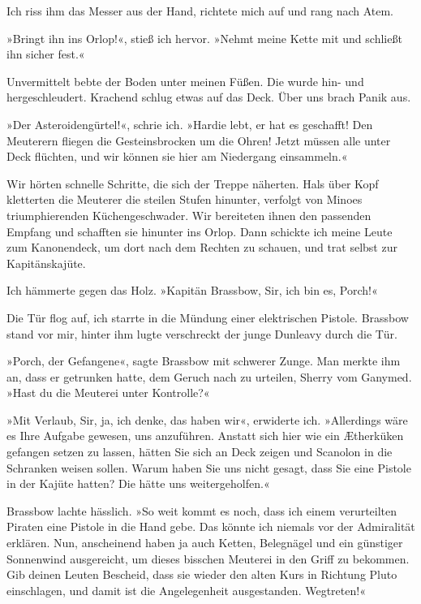 Ich riss ihm das Messer aus der Hand, richtete mich auf und rang
nach Atem.

»Bringt ihn ins Orlop!«, stieß ich hervor. »Nehmt meine Kette mit
und schließt ihn sicher fest.«

Unvermittelt bebte der Boden unter meinen Füßen. Die
 wurde hin- und hergeschleudert. Krachend schlug
etwas auf das Deck. Über uns brach Panik aus.

»Der Asteroidengürtel!«, schrie ich. »Hardie lebt, er hat es
geschafft! Den Meuterern fliegen die Gesteinsbrocken um die Ohren!
Jetzt müssen alle unter Deck flüchten, und wir können sie hier am
Niedergang einsammeln.«

Wir hörten schnelle Schritte, die sich der Treppe näherten. Hals
über Kopf kletterten die Meuterer die steilen Stufen hinunter,
verfolgt von Minoes triumphierenden Küchengeschwader. Wir
bereiteten ihnen den passenden Empfang und schafften sie hinunter
ins Orlop. Dann schickte ich meine Leute zum Kanonendeck, um dort
nach dem Rechten zu schauen, und trat selbst zur Kapitänskajüte.

Ich hämmerte gegen das Holz. »Kapitän Brassbow, Sir, ich bin es,
Porch!«

Die Tür flog auf, ich starrte in die Mündung einer elektrischen
Pistole. Brassbow stand vor mir, hinter ihm lugte verschreckt der
junge Dunleavy durch die Tür.

»Porch, der Gefangene«, sagte Brassbow mit schwerer Zunge. Man
merkte ihm an, dass er getrunken hatte, dem Geruch nach zu
urteilen, Sherry vom Ganymed. »Hast du die Meuterei unter
Kontrolle?«

»Mit Verlaub, Sir, ja, ich denke, das haben wir«, erwiderte ich.
»Allerdings wäre es Ihre Aufgabe gewesen, uns anzuführen. Anstatt
sich hier wie ein Ætherküken gefangen setzen zu lassen, hätten Sie
sich an Deck zeigen und Scanolon in die Schranken weisen sollen.
Warum haben Sie uns nicht gesagt, dass Sie eine Pistole in der
Kajüte hatten? Die hätte uns weitergeholfen.«

Brassbow lachte hässlich. »So weit kommt es noch, dass ich einem
verurteilten Piraten eine Pistole in die Hand gebe. Das könnte ich
niemals vor der Admiralität erklären. Nun, anscheinend haben ja
auch Ketten, Belegnägel und ein günstiger Sonnenwind ausgereicht,
um dieses bisschen Meuterei in den Griff zu bekommen. Gib deinen
Leuten Bescheid, dass sie wieder den alten Kurs in Richtung Pluto
einschlagen, und damit ist die Angelegenheit ausgestanden.
Wegtreten!«

